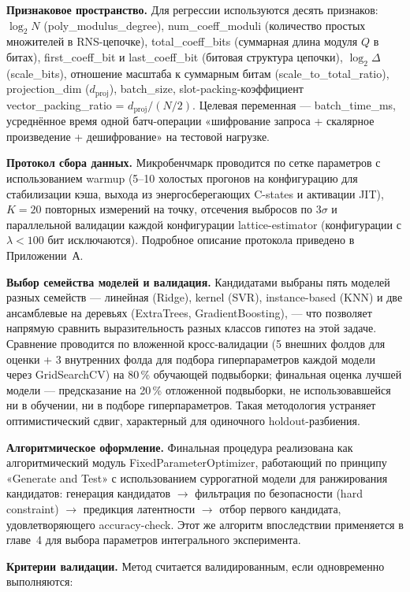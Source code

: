 \documentclass[a4paper, 12pt, oneside, openany]{article}
\begin{document}
\textbf{Признаковое пространство.} Для регрессии используются десять признаков: $\log_2 N$ (poly\_modulus\_degree), num\_coeff\_moduli (количество простых множителей в RNS-цепочке), total\_coeff\_bits (суммарная длина модуля $Q$ в битах), first\_coeff\_bit и last\_coeff\_bit (битовая структура цепочки), $\log_2 \Delta$ (scale\_bits), отношение масштаба к суммарным битам (scale\_to\_total\_ratio), projection\_dim ($d_{\mathrm{proj}}$), batch\_size, slot-packing-коэффициент vector\_packing\_ratio = $d_{\mathrm{proj}}/(N/2)$. Целевая переменная --- batch\_time\_ms, усреднённое время одной батч-операции «шифрование запроса + скалярное произведение + дешифрование» на тестовой нагрузке.

\textbf{Протокол сбора данных.} Микробенчмарк проводится по сетке параметров с использованием warmup (5--10 холостых прогонов на конфигурацию для стабилизации кэша, выхода из энергосберегающих C-states и активации JIT), $K = 20$ повторных измерений на точку, отсечения выбросов по $3\sigma$ и параллельной валидации каждой конфигурации lattice-estimator (конфигурации с $\lambda < 100$ бит исключаются). Подробное описание протокола приведено в Приложении~А.

\textbf{Выбор семейства моделей и валидация.} Кандидатами выбраны пять моделей разных семейств --- линейная (Ridge), kernel (SVR), instance-based (KNN) и две ансамблевые на деревьях (ExtraTrees, GradientBoosting), --- что позволяет напрямую сравнить выразительность разных классов гипотез на этой задаче. Сравнение проводится по вложенной кросс-валидации (5 внешних фолдов для оценки + 3 внутренних фолда для подбора гиперпараметров каждой модели через GridSearchCV) на 80\,\% обучающей подвыборки; финальная оценка лучшей модели --- предсказание на 20\,\% отложенной подвыборки, не использовавшейся ни в обучении, ни в подборе гиперпараметров. Такая методология устраняет оптимистический сдвиг, характерный для одиночного holdout-разбиения.

\textbf{Алгоритмическое оформление.} Финальная процедура реализована как алгоритмический модуль FixedParameterOptimizer, работающий по принципу «Generate and Test» с использованием суррогатной модели для ранжирования кандидатов: генерация кандидатов $\to$ фильтрация по безопасности (hard constraint) $\to$ предикция латентности $\to$ отбор первого кандидата, удовлетворяющего accuracy-check. Этот же алгоритм впоследствии применяется в главе~4 для выбора параметров интегрального эксперимента.

\textbf{Критерии валидации.} Метод считается валидированным, если одновременно выполняются:
\end{document}
